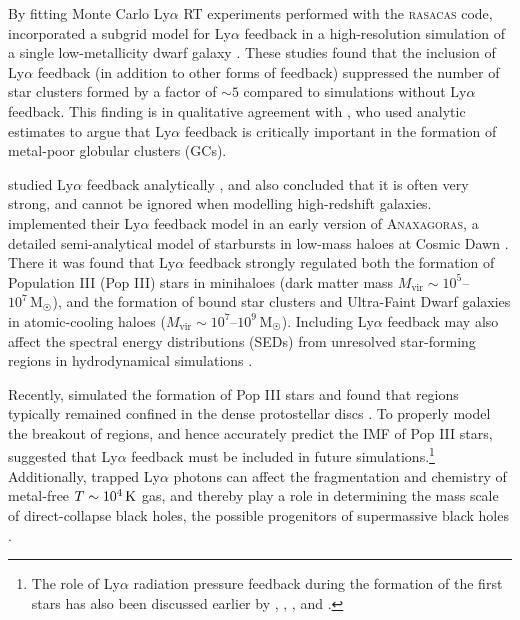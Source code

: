 \documentclass[fleqn,usenatbib]{mnras}
\newcommand\Msun{\text{M}_{\astrosun}} %
\newcommand\HII{\ion{H}{II}\xspace} %
\begin{document}
By fitting Monte Carlo Ly$\alpha$ RT experiments performed with the \textsc{rasacas} \citep{RASCAS} code, \cite{Kimm2018} incorporated a subgrid model for Ly$\alpha$ feedback in a high-resolution simulation of a single low-metallicity dwarf galaxy \citep[see also][]{Kimm2019, Han2022}. These studies found that the inclusion of Ly$\alpha$ feedback (in addition to other forms of feedback) suppressed the number of star clusters formed by a factor of $\sim 5$ compared to simulations without Ly$\alpha$ feedback. This finding is in qualitative agreement with \cite{Abe2018}, who used analytic estimates to argue that Ly$\alpha$ feedback is critically important in the formation of metal-poor globular clusters (GCs).

\cite{Tomaselli2021} studied Ly$\alpha$ feedback analytically \citep[see also][]{Lao2020}, and also concluded that it is often very strong, and cannot be ignored when modelling high-redshift galaxies. \cite{Nebrin2022} implemented their Ly$\alpha$ feedback model in an early version of \textsc{Anaxagoras}, a detailed semi-analytical model of starbursts in low-mass haloes at Cosmic Dawn \citep[][Nebrin, in prep.]{Nebrin2023cooling}. There it was found that Ly$\alpha$ feedback strongly regulated both the formation of Population III (Pop III) stars in minihaloes (dark matter mass $M_\text{vir} \sim 10^5$--$10^7\,\Msun$), and the formation of bound star clusters and Ultra-Faint Dwarf galaxies in atomic-cooling haloes ($M_\text{vir} \sim 10^7$--$10^9\,\Msun$). Including Ly$\alpha$ feedback may also affect the spectral energy distributions (SEDs) from unresolved star-forming regions in hydrodynamical simulations \citep{Kapoor2023}.

Recently, \cite{Jaura2022} simulated the formation of Pop III stars and found that \HII regions typically remained confined in the dense protostellar discs \citep[see also][]{Sharda2024}. To properly model the breakout of \HII regions, and hence accurately predict the IMF of Pop III stars, \cite{Jaura2022} suggested that Ly$\alpha$ feedback must be included in future simulations.\footnote{The role of Ly$\alpha$ radiation pressure feedback during the formation of the first stars has also been discussed earlier by \cite{Doroshkevich1976}, \cite{Omukai2002}, \cite{McKee2008}, and \cite{Stacy2012, Stacy2016}.} Additionally, trapped Ly$\alpha$ photons can affect the fragmentation and chemistry of metal-free $T \sim 10^4\,\rm K$ gas, and thereby play a role in determining the mass scale of direct-collapse black holes, the possible progenitors of supermassive black holes \citep[][]{Spaans2006, Milosavljevic2009, Latif2011, Johnson2017, Smith2017_DCBH, Ge2017}.
\end{document}
